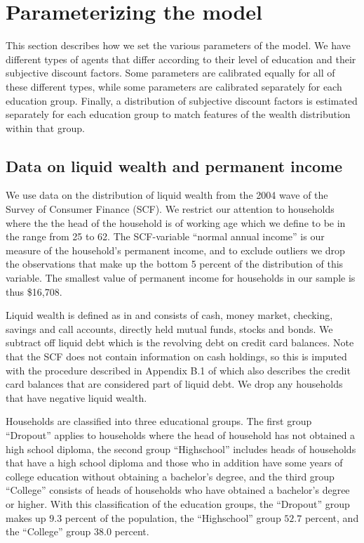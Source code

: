 \documentclass[11pt]{article}
\begin{document}
\section{Parameterizing the model}

This section describes how we set the various parameters of the model. We have different types of agents that differ according to their level of education and their subjective discount factors. Some parameters are calibrated equally for all of these different types, while some parameters are calibrated separately for each education group. Finally, a distribution of subjective discount factors is estimated separately for each education group to match features of the wealth distribution within that group. 

\subsection{Data on liquid wealth and permanent income}
\label{sec:estimData}

We use data on the distribution of liquid wealth from the 2004 wave of the Survey of Consumer Finance (SCF). We restrict our attention to households where the the head of the household is of working age which we define to be in the range from 25 to 62. The SCF-variable ``normal annual income'' is our measure of the household's permanent income, and to exclude outliers we drop the observations that make up the bottom 5 percent of the distribution of this variable. The smallest value of permanent income for households in our sample is thus \$16,708. 

Liquid wealth is defined as in \citet{kaplan2014model} and consists of cash, money market, checking, savings and call accounts, directly held mutual funds, stocks and bonds. We subtract off liquid debt which is the revolving debt on credit card balances. Note that the SCF does not contain information on cash holdings, so this is imputed with the procedure described in Appendix B.1 of \citet{kaplan2014model} which also describes the credit card balances that are considered part of liquid debt. We drop any households that have negative liquid wealth. 

Households are classified into three educational groups. The first group ``Dropout'' applies to households where the head of household has not obtained a high school diploma, the second group ``Highschool'' includes heads of households that have a high school diploma and those who in addition  have some years of college education without obtaining a bachelor's degree, and the third group ``College'' consists of heads of households who have obtained a bachelor's degree or higher. With this classification of the education groups, the ``Dropout'' group makes up $9.3$ percent of the population, the ``Highschool'' group $52.7$ percent, and the ``College'' group $38.0$ percent. 
\end{document}
